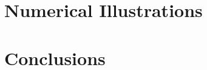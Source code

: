 \documentclass{article}
\begin{document}
\section{Numerical Illustrations}



\section{Conclusions}





%
%
%
%
%
%
%
%
\end{document}
